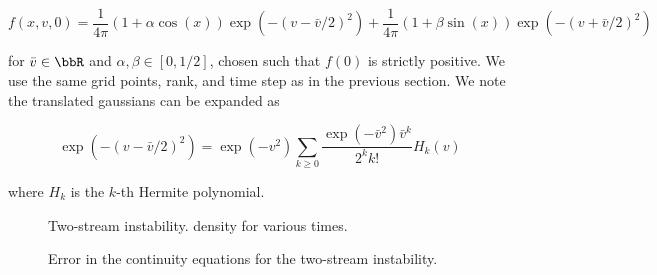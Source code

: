 \begin{equation}
    f(x, v, 0) = \frac{1}{4 \pi} (1 + \alpha \cos(x)) \exp (-(v - \bar{v}/2)^2)
        + \frac{1}{4 \pi} (1 + \beta \sin(x)) \exp (-(v + \bar{v}/2)^2)
\end{equation}

for $\bar{v} \in \bbR$ and $\alpha, \beta \in \left[ 0, 1/2 \right]$, chosen
such that $f(0)$ is strictly positive. We use the same grid points, rank, and
time step as in the previous section. We note the translated gaussians can be
expanded as

\begin{equation}
    \exp(-(v - \bar{v}/2)^2) = \exp(-v^2) 
    \sum_{k \geq 0} \frac{\exp(-\bar{v}^2) \bar{v}^k}{2^k k!} H_k (v)
\end{equation}

where $H_k$ is the $k$-th Hermite polynomial. 

\begin{figure}
    \centering
    \begin{subfigure}{0.45\textwidth}
    \end{subfigure}
    \begin{subfigure}{0.45\textwidth}
    \end{subfigure}
    \caption{
        Two-stream instability. density for various times. 
    }\label{fig:density_two_stream}
\end{figure}

\begin{figure}
    \centering
    \begin{subfigure}{0.45\textwidth}
    \end{subfigure}
    \begin{subfigure}{0.45\textwidth}
    \end{subfigure}
    \begin{subfigure}{0.45\textwidth}
    \end{subfigure}
    \begin{subfigure}{0.45\textwidth}
    \end{subfigure}
    \caption{
        Error in the continuity equations for the two-stream instability. 
    }\label{fig:moments_two_stream}
\end{figure}

